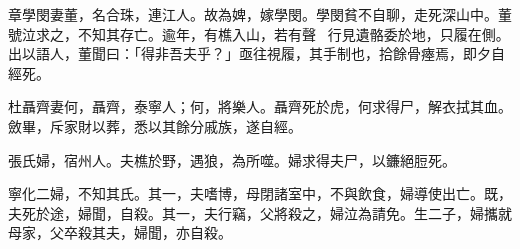 \begin{pinyinscope}
章學閔妻董，名合珠，連江人。故為婢，嫁學閔。學閔貧不自聊，走死深山中。董號泣求之，不知其存亡。逾年，有樵入山，若有聲，行見遺骼委於地，只履在側。出以語人，董聞曰：「得非吾夫乎？」亟往視履，其手制也，拾餘骨瘞焉，即夕自經死。

杜聶齊妻何，聶齊，泰寧人；何，將樂人。聶齊死於虎，何求得尸，解衣拭其血。斂畢，斥家財以葬，悉以其餘分戚族，遂自經。

張氏婦，宿州人。夫樵於野，遇狼，為所噬。婦求得夫尸，以鐮絕脰死。

寧化二婦，不知其氏。其一，夫嗜博，母閉諸室中，不與飲食，婦導使出亡。既，夫死於途，婦聞，自殺。其一，夫行竊，父將殺之，婦泣為請免。生二子，婦攜就母家，父卒殺其夫，婦聞，亦自殺。


\end{pinyinscope}